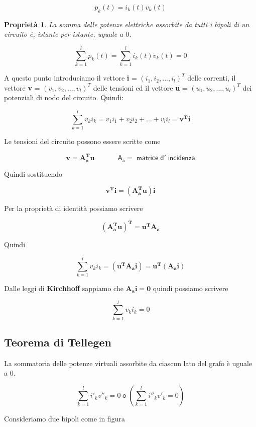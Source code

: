 \documentclass[a4paper]{report}
\begin{document}
\[
p_k(t)=i_k(t)v_k(t)
\]

\newtheorem{mydef}{Propriet\`a}
\begin{mydef}
  La somma delle potenze elettriche assorbite da tutti i bipoli di
  un circuito \`e, istante per istante, uguale a $0$.
\end{mydef}

\[
\sum_{k=1}^{l} p_k(t) = \sum_{k=1}^{l} i_k(t)v_k(t)=0
\]

A questo punto introduciamo il vettore {\bf i} = $(i_1, i_2,..., i_l)^T$
delle correnti, il vettore {\bf v} = $(v_1, v_2,..., v_l)^T$ delle
tensioni ed il vettore {\bf u} = $(u_1, u_2,..., u_l)^T$ dei
potenziali di nodo del circuito. Quindi:

\[
\sum_{k=1}^l v_ki_k=v_1i_1+v_2i_2+...+v_li_l = \mathbf{v^Ti}
\]

Le tensioni del circuito possono essere scritte come

\[
\mathbf{v= A_a^Tu} \quad \quad \quad \mathsf{\;A_a= \; matrice\; d'\; incidenza}
\]

Quindi sostituendo

\[
\mathbf{v^Ti=(A_a^Tu)i}
\]

Per la propriet\`a di identit\`a possiamo scrivere

\[
\mathbf{(A_a^Tu)^T=u^TA_a}
\]

Quindi

\[
\sum_{k=1}^l v_ki_k=\mathbf{(u^TA_ai) = u^T(A_ai)}
\]

Dalle leggi di {\bf Kirchhoff} sappiamo che $\mathbf{A_ai=0}$ quindi
possiamo scrivere

\[
\sum_{k=1}^{l}v_ki_k=0
\]


\subsection{Teorema di Tellegen}

La sommatoria delle potenze virtuali assorbite da ciascun lato del
grafo \`e uguale a $0$.

\[
\sum_{k=1}^li'_k v''_k = 0\; \mathsf {o}\; \left(\sum_{k=1}^li''_k v'_k=0\right)
\]

Consideriamo due bipoli come in figura

\vspace{1.5cm}
\end{document}
